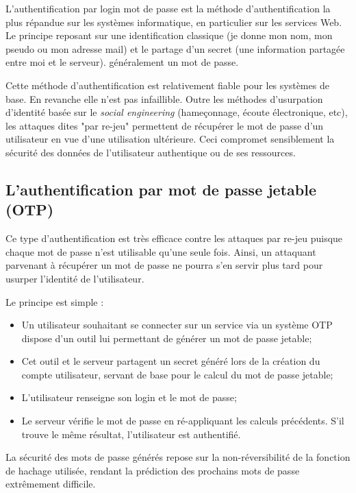 	L'authentification par login \/ mot de passe est la méthode d'authentification
	la plus répandue sur les systèmes informatique, en particulier sur les 
	services Web. Le principe reposant sur une identification classique (je donne
	mon nom, mon pseudo ou mon adresse mail) et le partage d'un secret (une 
	information partagée entre moi et le serveur). généralement un mot de passe.
	
	Cette méthode d'authentification est relativement fiable pour les systèmes de 
	base. En revanche elle n'est pas infaillible. Outre les méthodes d'usurpation 
	d'identité basée sur le \emph{social engineering} (hameçonnage, écoute 
	électronique, etc), les attaques dites "par re-jeu" permettent de récupérer le
	mot de passe d'un utilisateur en vue d'une utilisation ultérieure. Ceci 
	compromet sensiblement la sécurité des données de l'utilisateur authentique ou
	de ses ressources.

\subsection{L'authentification par mot de passe jetable (OTP)}

	Ce type d'authentification est très efficace contre les attaques par re-jeu 
	puisque chaque mot de passe n'est utilisable qu'une seule fois. Ainsi, un 
	attaquant parvenant à récupérer un mot de passe ne pourra s'en servir plus 
	tard pour usurper l'identité de l'utilisateur.
	
	Le principe est simple :
	\begin{itemize}
		\item Un utilisateur souhaitant se connecter sur un service via un système 
		OTP dispose d'un outil lui permettant de générer un mot de passe jetable;
		\item Cet outil et le serveur partagent un secret généré lors de la création 
		du compte utilisateur, servant de base pour le calcul du mot de passe jetable;
		\item L'utilisateur renseigne son login et le mot de passe;
		\item Le serveur vérifie le mot de passe en ré-appliquant les calculs 
		précédents. S'il trouve le même résultat, l'utilisateur est authentifié.
	\end{itemize}
	
	La sécurité des mots de passe générés repose sur la non-réversibilité de la 
	fonction de hachage utilisée, rendant la prédiction des prochains mots de 
	passe extrêmement difficile.

